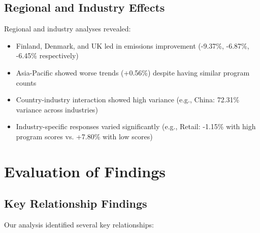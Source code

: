 \documentclass[11pt,a4paper]{article}
\begin{document}
\subsection{Regional and Industry Effects}
Regional and industry analyses revealed:

\begin{itemize}
    \item Finland, Denmark, and UK led in emissions improvement (-9.37\%, -6.87\%, -6.45\% respectively)
    
    \item Asia-Pacific showed worse trends (+0.56\%) despite having similar program counts
    
    \item Country-industry interaction showed high variance (e.g., China: 72.31\% variance across industries)
    
    \item Industry-specific responses varied significantly (e.g., Retail: -1.15\% with high program scores vs. +7.80\% with low scores)
\end{itemize}

\section{Evaluation of Findings}

\subsection{Key Relationship Findings}
Our analysis identified several key relationships:
\end{document}
